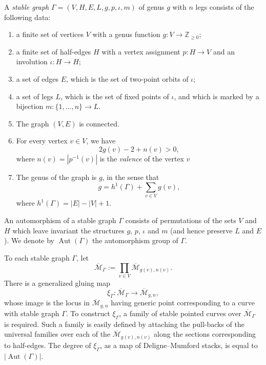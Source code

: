 \documentclass[12pt,reqno]{amsart}
\DeclareMathOperator{\Aut}{Aut}
\theoremstyle{plain}
\theoremstyle{definition}
\theoremstyle{remark}
\begin{document}
A {\it stable graph} $\Gamma=(V,H,E,L,g,p,\iota,m)$ of genus $g$ with $n$ legs consists of the following data:
\begin{enumerate}
\item a finite set of vertices $V$  with a genus function $g\colon V\to \mathbb{Z}_{\geq 0}$;

\item a finite set of half-edges $H$  with a vertex assignment $p\colon H\to V$ and an involution $\iota\colon H\to H$;

\item a set of edges $E$, which is the set of two-point orbits of $\iota$;

\item a set of legs $L$, which is the set of fixed points of $\iota$, and which is marked by a bijection $m\colon\{1,\ldots,n\}\to L$.

\item The graph $(V,E)$ is connected.

\item For every vertex $v\in V$, we have
\begin{equation*}
  2g(v)-2+n(v) > 0,
\end{equation*}
where $n(v)=|  p^{-1}(v)|$ is the {\it valence} of the vertex $v$
\item The genus of the graph is $g$, in the sense that
\begin{equation*}\label{eq:genus}
g=h^1(\Gamma)+\sum_{v\in V}g(v),
\end{equation*}
where $h^1(\Gamma)= |E|- |V|+1$.
\end{enumerate}


An automorphism of a stable graph $\Gamma$ consists of permutations of the sets $V$ and $H$ which
leave invariant the structures  $g$, $p$, $\iota$ and $m$ (and hence preserve $L$ and $E$). We denote by $\Aut(\Gamma)$ the automorphism group of $\Gamma$.

To each stable graph $\Gamma$, let
\begin{equation*}
\overline{\mathcal{M}}_{\Gamma}:=\prod_{v\in V}\overline{\mathcal{M}}_{g(v),n(v)}.
\end{equation*}
There is a generalized  gluing map
\begin{equation}\label{eq:xi}
\xi_{\Gamma}\colon\overline{\mathcal{M}}_{\Gamma}\to \overline{\mathcal{M}}_{g,n},
\end{equation}
whose image is the locus in $\overline{\mathcal{M}}_{g,n}$ having generic point corresponding to a curve with stable graph $\Gamma$. To
construct $\xi_{\Gamma}$, a family of stable pointed curves over $\overline{\mathcal{M}}_{\Gamma}$ is required. Such a
family is easily defined by attaching the pull-backs of the universal families
over each of the $\overline{\mathcal{M}}_{g(v),n(v)}$ along the sections corresponding to half-edges.  The degree of $\xi_{\Gamma}$, as a map of Deligne--Mumford stacks, is equal to $|\Aut(\Gamma)|$.
\end{document}
